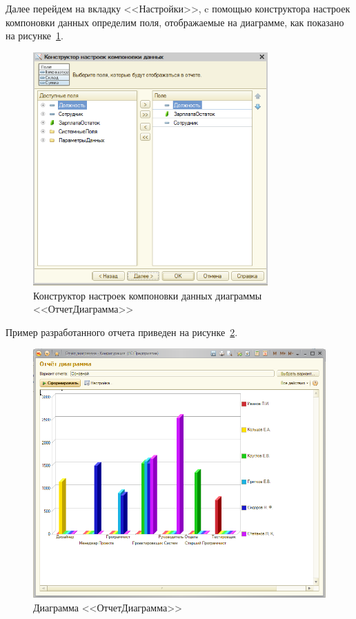Далее перейдем на вкладку <<Настройки>>, c помощью конструктора
настроек компоновки данных определим поля, отображаемые на диаграмме,
как показано на рисунке~\ref{fig:diagramm_constructor}.
\begin{figure}[h!]
  \centering
  \includegraphics[width=90mm]{pic/diagramm_constructor}
  \caption{Конструктор настроек компоновки данных диаграммы <<ОтчетДиаграмма>>}
  \label{fig:diagramm_constructor}
\end{figure}

\pagebreak

Пример разработанного отчета приведен на рисунке~\ref{fig:diagram_results}.

\begin{figure}[h!]
  \centering
  \includegraphics[width=140mm]{pic/diagram_results}
  \caption{Диаграмма <<ОтчетДиаграмма>>}
  \label{fig:diagram_results}
\end{figure}

